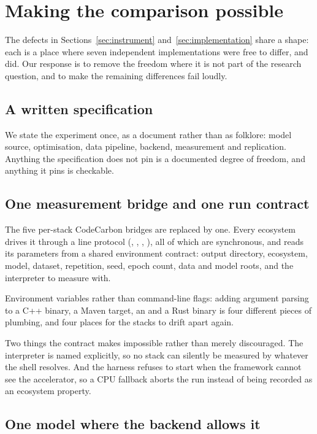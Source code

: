 \section{Making the comparison possible}
\label{sec:infrastructure}

The defects in Sections~\ref{sec:instrument} and~\ref{sec:implementation} share a
shape: each is a place where seven independent implementations were free to
differ, and did. Our response is to remove the freedom where it is not part of
the research question, and to make the remaining differences fail loudly.

\subsection{A written specification}

We state the experiment once, as a document rather than as folklore: model
source, optimisation, data pipeline, backend, measurement and replication.
Anything the specification does not pin is a documented degree of freedom, and
anything it pins is checkable.

\subsection{One measurement bridge and one run contract}

The five per-stack CodeCarbon bridges are replaced by one. Every ecosystem drives
it through a line protocol (, , ,
), all of which are synchronous, and reads its parameters from a
shared environment contract: output directory, ecosystem, model, dataset,
repetition, seed, epoch count, data and model roots, and the interpreter to
measure with.

Environment variables rather than command-line flags: adding argument parsing to
a C++ binary, a Maven target, an  and a Rust binary is four
different pieces of plumbing, and four places for the stacks to drift apart
again.

Two things the contract makes impossible rather than merely discouraged. The
interpreter is named explicitly, so no stack can silently be measured by whatever
 the shell resolves. And the harness refuses to start when the
framework cannot see the accelerator, so a CPU fallback aborts the run instead of
being recorded as an ecosystem property.

\subsection{One model where the backend allows it}

